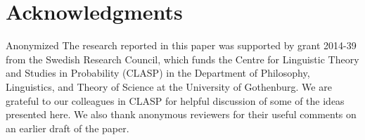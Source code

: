 \documentclass[a4paper,twoside]{article}
\begin{document}
\section*{Acknowledgments}

\ifanon
Anonymized
\else
The research reported in this paper was supported by grant 2014-39 from the
Swedish Research Council, which funds the Centre for Linguistic Theory and
Studies in Probability (CLASP) in the Department of Philosophy, Linguistics,
and Theory of Science at the University of Gothenburg. We are grateful to
our colleagues in CLASP for helpful discussion of some of the ideas presented
here. We also thank anonymous reviewers for their useful comments on an
earlier draft of the paper.
\fi



\end{document}
